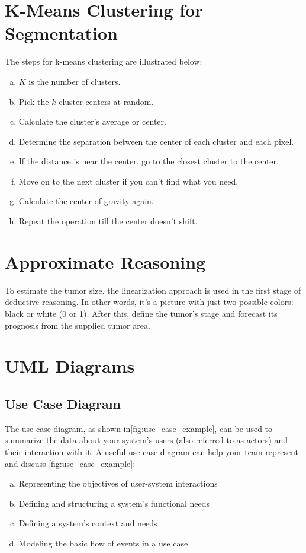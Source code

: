 \section{K-Means Clustering for Segmentation}
The steps for k-means clustering are illustrated below:
\begin{enumerate}[a)]
    \item $K$ is the number of clusters.
    \item Pick the $k$ cluster centers at random.
    \item Calculate the cluster's average or center.
    \item Determine the separation between the center of each cluster and each pixel.
    \item If the distance is near the center, go to the closest cluster to the center.
    \item Move on to the next cluster if you can't find what you need.
    \item Calculate the center of gravity again.
    \item Repeat the operation till the center doesn't shift.
\end{enumerate}

\section{Approximate Reasoning}

To estimate the tumor size, the linearization approach is used in the first stage of deductive reasoning. In other words, it's a picture with just two possible colors: black or white (0 or 1). After this, define the tumor's stage and forecast its prognosis from the supplied tumor area.

\section{UML Diagrams}
\subsection{Use Case Diagram}

The use case diagram, as shown in\ref{fig:use_case_example}, can be used to summarize the data about your system's users (also referred to as actors) and their interaction with it. A useful use case diagram can help your team represent and discuss \ref{fig:use_case_example}:
\begin{enumerate}[a)]
    \item Representing the objectives of user-system interactions
    \item Defining and structuring a system's functional needs
    \item Defining a system's context and needs
    \item Modeling the basic flow of events in a use case
\end{enumerate}

